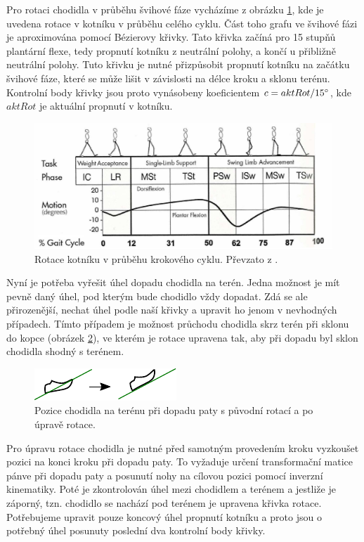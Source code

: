 Pro rotaci chodidla v průběhu švihové fáze vycházíme z obrázku \ref{fig:ankleRot}, kde je uvedena rotace v kotníku v průběhu celého cyklu. Část toho grafu ve švihové fázi je aproximována pomocí Bézierovy křivky. Tato křivka začíná pro 15 stupňů plantární flexe, tedy propnutí kotníku z neutrální polohy, a končí u přibližně neutrální polohy. Tuto křivku je nutné přizpůsobit propnutí kotníku na začátku švihové fáze, které se může lišit v závislosti na délce kroku a sklonu terénu. Kontrolní body křivky jsou proto vynásobeny koeficientem $c = aktRot / 15\degree$, kde $aktRot$ je aktuální propnutí v kotníku. 

\begin{figure}[h]
	\centering
	\includegraphics[width=0.9\linewidth]{fig/ankle_kinematics.png}
	\caption{Rotace kotníku v průběhu krokového cyklu. Převzato z \cite{biomechanika_chuze}.}
	\label{fig:ankleRot}
\end{figure}

Nyní je potřeba vyřešit úhel dopadu chodidla na terén.  Jedna možnost je mít pevně daný úhel, pod kterým bude chodidlo vždy dopadat. Zdá se ale přirozenější, nechat úhel podle naší křivky a upravit ho jenom v nevhodných případech. Tímto případem je možnost průchodu chodidla skrz terén při sklonu do kopce (obrázek \ref{fig:swingRotFix}), ve kterém je rotace upravena tak, aby při dopadu byl sklon chodidla shodný s terénem. 

\begin{figure}[h]
	\centering
	\includegraphics[width=0.6\linewidth]{fig/foot_through_terrain.pdf}
	\caption{Pozice chodidla na terénu při dopadu paty s původní rotací a po úpravě rotace.}
	\label{fig:swingRotFix}
\end{figure}

Pro úpravu rotace chodidla je nutné před samotným provedením kroku vyzkoušet pozici na konci kroku při dopadu paty. To vyžaduje určení transformační matice pánve při dopadu paty a posunutí nohy na cílovou pozici pomocí inverzní kinematiky. Poté je zkontrolován úhel mezi chodidlem a terénem a jestliže je záporný, tzn. chodidlo se nachází pod terénem je upravena křivka rotace. Potřebujeme upravit pouze koncový úhel propnutí kotníku a proto jsou o potřebný úhel posunuty poslední dva kontrolní body křivky.

